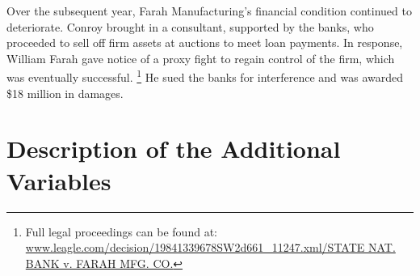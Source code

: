 \documentclass[12pt]{article}
\begin{document}
\begin{appendices}
Over the subsequent year, Farah Manufacturing's financial condition continued to deteriorate.
Conroy brought in a consultant, supported by the banks, who proceeded to sell off firm assets at auctions to meet loan payments.
In response, William Farah gave notice of a proxy fight to regain control of the firm, which was eventually successful.%
    \footnote{Full legal proceedings can be found at: \href{https://web.archive.org/web/20151029083607/http://www.leagle.com/decision/19841339678SW2d661_11247.xml/STATE\%20NAT.\%20BANK\%20v.\%20FARAH\%20MFG.\%20CO}{www.leagle.com/decision/19841339678SW2d661\_11247.xml/STATE NAT. BANK v. FARAH MFG. CO.}}
He sued the banks for interference and was awarded \$18 million in damages.






\section{Description of the Additional Variables}
\label{IApp:vardef}
\vspace{-1em}







%
%
\renewcommand{\refname}{REFERENCES}
{\singlespacing
    
    
}










\end{appendices}
\end{document}
